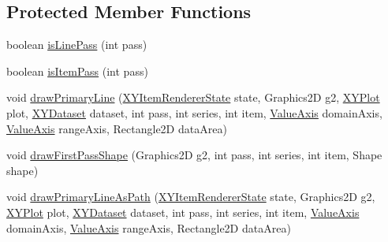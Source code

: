 \subsection*{Protected Member Functions}
\begin{DoxyCompactItemize}
\item 
boolean \mbox{\hyperlink{classorg_1_1jfree_1_1chart_1_1renderer_1_1xy_1_1_x_y_line_and_shape_renderer_a4d8409c509d8ac71ad3808fb0f73b0b0}{is\+Line\+Pass}} (int pass)
\item 
boolean \mbox{\hyperlink{classorg_1_1jfree_1_1chart_1_1renderer_1_1xy_1_1_x_y_line_and_shape_renderer_ac1c16965412431e827c5513a0018a477}{is\+Item\+Pass}} (int pass)
\item 
void \mbox{\hyperlink{classorg_1_1jfree_1_1chart_1_1renderer_1_1xy_1_1_x_y_line_and_shape_renderer_aafd935b3004ae514cbbf555e65bad29a}{draw\+Primary\+Line}} (\mbox{\hyperlink{classorg_1_1jfree_1_1chart_1_1renderer_1_1xy_1_1_x_y_item_renderer_state}{X\+Y\+Item\+Renderer\+State}} state, Graphics2D g2, \mbox{\hyperlink{classorg_1_1jfree_1_1chart_1_1plot_1_1_x_y_plot}{X\+Y\+Plot}} plot, \mbox{\hyperlink{interfaceorg_1_1jfree_1_1data_1_1xy_1_1_x_y_dataset}{X\+Y\+Dataset}} dataset, int pass, int series, int item, \mbox{\hyperlink{classorg_1_1jfree_1_1chart_1_1axis_1_1_value_axis}{Value\+Axis}} domain\+Axis, \mbox{\hyperlink{classorg_1_1jfree_1_1chart_1_1axis_1_1_value_axis}{Value\+Axis}} range\+Axis, Rectangle2D data\+Area)
\item 
void \mbox{\hyperlink{classorg_1_1jfree_1_1chart_1_1renderer_1_1xy_1_1_x_y_line_and_shape_renderer_ac3db516e37316d1935162a6e32781037}{draw\+First\+Pass\+Shape}} (Graphics2D g2, int pass, int series, int item, Shape shape)
\item 
void \mbox{\hyperlink{classorg_1_1jfree_1_1chart_1_1renderer_1_1xy_1_1_x_y_line_and_shape_renderer_afe5f965ab2e634fd1db54b445dc07624}{draw\+Primary\+Line\+As\+Path}} (\mbox{\hyperlink{classorg_1_1jfree_1_1chart_1_1renderer_1_1xy_1_1_x_y_item_renderer_state}{X\+Y\+Item\+Renderer\+State}} state, Graphics2D g2, \mbox{\hyperlink{classorg_1_1jfree_1_1chart_1_1plot_1_1_x_y_plot}{X\+Y\+Plot}} plot, \mbox{\hyperlink{interfaceorg_1_1jfree_1_1data_1_1xy_1_1_x_y_dataset}{X\+Y\+Dataset}} dataset, int pass, int series, int item, \mbox{\hyperlink{classorg_1_1jfree_1_1chart_1_1axis_1_1_value_axis}{Value\+Axis}} domain\+Axis, \mbox{\hyperlink{classorg_1_1jfree_1_1chart_1_1axis_1_1_value_axis}{Value\+Axis}} range\+Axis, Rectangle2D data\+Area)
\item 

\end{DoxyCompactItemize}
